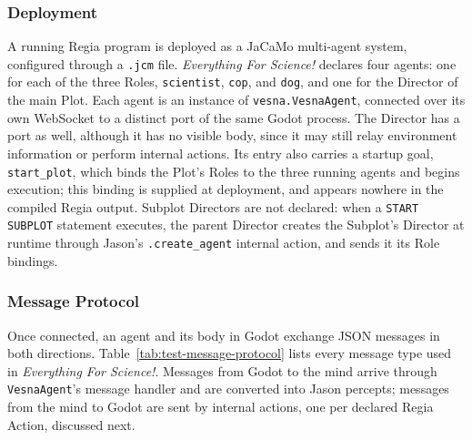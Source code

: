 \subsubsection{Deployment}
\label{sec:test-deployment}

A running Regia program is deployed as a JaCaMo multi-agent system, configured through a \lstinline|.jcm| file. \emph{Everything For Science!} declares four agents: one for each of the three Roles, \lstinline|scientist|, \lstinline|cop|, and \lstinline|dog|, and one for the Director of the main Plot. Each agent is an instance of \lstinline|vesna.VesnaAgent|, connected over its own WebSocket to a distinct port of the same Godot process. The Director has a port as well, although it has no visible body, since it may still relay environment information or perform internal actions. Its entry also carries a startup goal, \lstinline|start_plot|, which binds the Plot's Roles to the three running agents and begins execution; this binding is supplied at deployment, and appears nowhere in the compiled Regia output. Subplot Directors are not declared: when a \lstinline|START SUBPLOT| statement executes, the parent Director creates the Subplot's Director at runtime through Jason's \lstinline|.create_agent| internal action, and sends it its Role bindings.

\subsubsection{Message Protocol}
\label{sec:test-protocol}

Once connected, an agent and its body in Godot exchange JSON messages in both directions. Table~\ref{tab:test-message-protocol} lists every message type used in \emph{Everything For Science!}. Messages from Godot to the mind arrive through \lstinline|VesnaAgent|'s message handler and are converted into Jason percepts; messages from the mind to Godot are sent by internal actions, one per declared Regia Action, discussed next.

